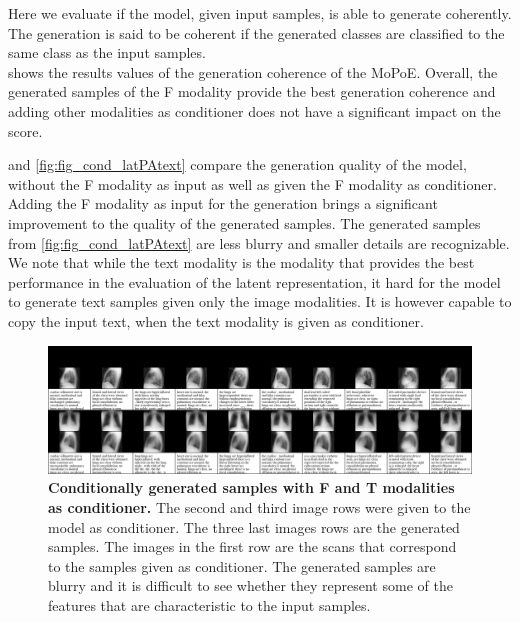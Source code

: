 \documentclass{midl} %
\begin{document}
    Here we evaluate if the model, given input samples, is able to generate coherently.
    The generation is said to be coherent if the generated classes are classified to the same class as the input samples.\\
     shows the results values of the generation coherence of the MoPoE.
    Overall, the generated samples of the F modality provide the best generation coherence and adding other modalities as conditioner does not have a significant impact on the score.
    
     and \cref{fig:fig_cond_latPAtext} compare the generation quality of the model, without the F modality as input as well as given the F modality as conditioner.
    Adding the F modality as input for the generation brings a significant improvement to the quality of the generated samples.
    The generated samples from \cref{fig:fig_cond_latPAtext} are less blurry and smaller details are recognizable.
    We note that while the text modality is the modality that provides the best performance in the evaluation of the latent representation, it hard for the model to generate text samples given only the image modalities.
    It is however capable to copy the input text, when the text modality is given as conditioner.
    
    
    \begin{figure}
        \centering
        \includegraphics[width=\textwidth]{data/cond_gen/Lateral_text}
        \caption{
            \textbf{Conditionally generated samples with F and T modalities as conditioner.} The second and third image rows were given to the model as conditioner. The three last images rows are the generated samples. The images in the first row are the scans that correspond to the samples given as conditioner. The generated samples are blurry and it is difficult to see whether they represent some of the features that are characteristic to the input samples.
        }
        \label{fig:fig_cond_lattext}
    \end{figure}
    
\end{document}
